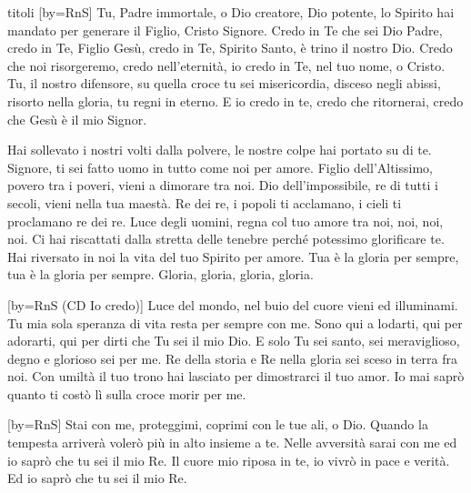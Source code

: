 \begin{songs}{titoli}
[by={RnS}]
\beginverse
Tu, Padre immortale,
o Dio creatore,
Dio potente,
lo Spirito hai mandato
per generare il Figlio, Cristo Signore.
\endverse
\beginchorus
Credo in Te che sei Dio Padre,
credo in Te, Figlio Gesù,
credo in Te, Spirito Santo,
è trino il nostro Dio.
Credo che noi risorgeremo,
credo nell'eternità,
io credo in Te, nel tuo nome, o Cristo.
\endchorus
\beginverse
Tu, il nostro difensore,
su quella croce tu sei misericordia,
disceso negli abissi, risorto nella gloria,
tu regni in eterno.
\endverse
\beginverse*
E io credo in te,
credo che ritornerai,
credo che Gesù è il mio Signor. 
\endverse
\endsong

\beginverse
Hai sollevato i nostri volti dalla polvere,
le nostre colpe hai portato su di te.
Signore, ti sei fatto uomo
in tutto come noi per amore.
\endverse
\beginchorus
Figlio dell'Altissimo, povero tra i poveri,
vieni a dimorare tra noi.
Dio dell'impossibile, re di tutti i secoli,
vieni nella tua maestà.
Re dei re, i popoli ti acclamano,
i cieli ti proclamano re dei re.
Luce degli uomini,
regna col tuo amore tra noi, noi, noi, noi.
\endchorus
\beginverse
Ci hai riscattati dalla stretta delle tenebre
perché potessimo glorificare te.
Hai riversato in noi la vita
del tuo Spirito per amore.
\endverse
\beginverse*
Tua è la gloria per sempre,
tua è la gloria per sempre.
Gloria, gloria,
gloria, gloria.
\endverse
\endsong

[by={RnS (CD Io credo)}]
\beginverse
Luce del mondo, nel buio del cuore vieni ed illuminami.
Tu mia sola speranza di vita resta per sempre con me.
\endverse
\beginchorus
Sono qui a lodarti, qui per adorarti, qui per dirti che Tu sei il mio Dio.
E solo Tu sei santo, sei meraviglioso, degno e glorioso sei per me.
\endchorus
\beginverse
Re della storia e Re nella gloria sei sceso in terra fra noi.
Con umiltà il tuo trono hai lasciato per dimostrarci il tuo amor.
\endverse
\beginverse*
Io mai saprò quanto ti costò lì sulla croce morir per me. 
\endverse
\endsong

[by={RnS}]
\beginverse
Stai con me, proteggimi,
coprimi con le tue ali, o Dio.
\endverse
\beginchorus
Quando la tempesta arriverà
volerò più in alto insieme a te.
Nelle avversità sarai con me
ed io saprò che tu sei il mio Re.
\endchorus
\beginverse
Il cuore mio riposa in te,
io vivrò in pace e verità.
\endverse
\beginverse*
Ed io saprò che tu sei il mio Re. 
\endverse
\endsong


\end{songs}
